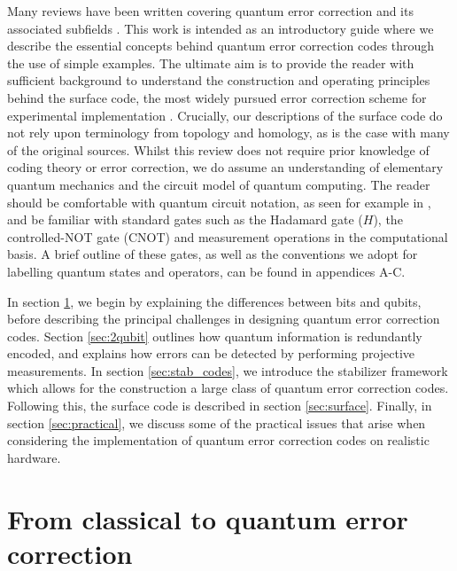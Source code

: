 \documentclass[]{arxiv}
\theoremstyle{plain}%
\theoremstyle{definition}
\theoremstyle{remark}
\newcommand{\cnoteq}{\leavevmode\hbox{\footnotesize{CNOT}}}
\begin{document}
Many reviews have been written covering quantum error correction and its associated subfields \cite{Gaitan08,Gottesman09,Djordjevic12,Devitt13,Lidar13,Terhal15,Campbell17}. This work is intended as an introductory guide where we describe the essential concepts behind quantum error correction codes through the use of simple examples. The ultimate aim is to provide the reader with sufficient background to understand the construction and operating principles behind the surface code, the most widely pursued error correction scheme for experimental implementation \cite{Fowler12}. Crucially, our descriptions of the surface code do not rely upon terminology from topology and homology, as is the case with many of the original sources. Whilst this review does not require prior knowledge of coding theory or error correction, we do assume an understanding of elementary quantum mechanics and the circuit model of quantum computing. The reader should be comfortable with quantum circuit notation, as seen for example in \cite{Nielsen2010}, and be familiar with standard gates such as the Hadamard gate ($H$), the controlled-{NOT} gate (\cnoteq) and measurement operations in the computational basis. A brief outline of these gates, as well as the conventions we adopt for labelling quantum states and operators, can be found in appendices A-C.

In section \ref{sec:class_to_quantum}, we begin by explaining the differences between bits and qubits, before describing the principal challenges in designing quantum error correction codes. Section \ref{sec:2qubit} outlines how quantum information is redundantly encoded, and explains how errors can be detected by performing projective measurements. In section \ref{sec:stab_codes}, we introduce the stabilizer framework which allows for the construction a large class of quantum error correction codes. Following this, the surface code is described in section \ref{sec:surface}. Finally, in section \ref{sec:practical}, we discuss some of the practical issues that arise when considering the implementation of quantum error correction codes on realistic hardware.

 

     






\section{From classical to quantum error correction} \label{sec:class_to_quantum}
\end{document}
